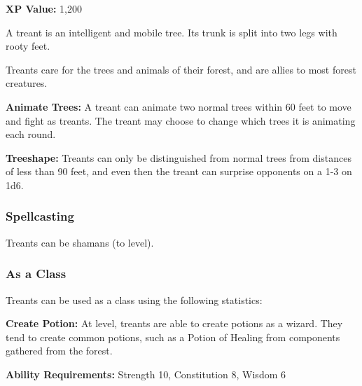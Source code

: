 \begin{multicols*}{2}
{{\textbf{XP Value:} 1,200}}

A treant is an intelligent and mobile tree. Its trunk is split into two legs with rooty feet.

Treants care for the trees and animals of their forest, and are allies to most forest creatures.

\textbf{Animate Trees:} A treant can animate two normal trees within 60 feet to move and fight as treants. The treant may choose to change which trees it is animating each round.

\textbf{Treeshape:} Treants can only be distinguished from normal trees from distances of less than 90 feet, and even then the treant can surprise opponents on a 1-3 on 1d6.

\subsubsection{Spellcasting}
Treants can be shamans (to  level).

\subsubsection{As a Class}
Treants can be used as a class using the following statistics:

\textbf{Create Potion:} At  level, treants are able to create potions as a wizard. They tend to create common potions, such as a Potion of Healing from components gathered from the forest.

\textbf{Ability Requirements:} Strength 10, Constitution 8, Wisdom 6



\end{multicols*}
